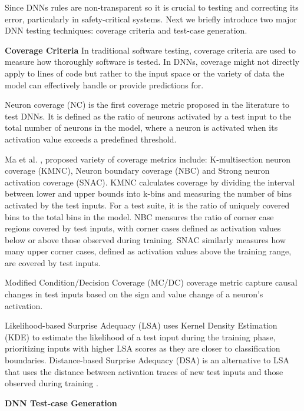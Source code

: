 \documentclass[10pt, conference, a4paper, final]{IEEEtran}
\begin{document}
Since DNNs rules are non-transparent \cite{deepxplore}  so it is crucial to testing and correcting its error, particularly in safety-critical systems. Next we briefly introduce two major DNN testing techniques: coverage criteria and test-case generation.

\smallskip\noindent%
\textbf{Coverage Criteria}
In traditional software testing, coverage criteria are used to measure how thoroughly software is tested. In DNNs, coverage might not directly apply to lines of code but rather to the input space or the variety of data the model can effectively handle or provide predictions for.

Neuron coverage (NC) \cite{deepxplore} is the first coverage metric proposed in the literature to test DNNs. It is defined as the ratio of neurons activated by a test input to the total number of neurons in the model, where a neuron is activated when its activation value exceeds a predefined threshold. 

Ma et al. \cite{deepguage}, proposed variety of coverage metrics include: K-multisection neuron coverage (KMNC), Neuron boundary coverage (NBC) and Strong neuron activation coverage (SNAC). KMNC calculates coverage by dividing the interval between lower and upper bounds into k-bins and measuring the number of bins activated by the test inputs. For a test suite, it is the ratio of uniquely covered bins to the total bins in the model. NBC measures the ratio of corner case regions covered by test inputs, with corner cases defined as activation values below or above those observed during training. SNAC similarly measures how many upper corner cases, defined as activation values above the training range, are covered by test inputs. 

Modified Condition/Decision Coverage (MC/DC) \cite{SunY} coverage metric  capture causal changes in test inputs based on the sign and value change of a neuron's activation. 

Likelihood-based Surprise Adequacy (LSA) uses Kernel Density Estimation (KDE) to estimate the likelihood of a test input during the training phase, prioritizing inputs with higher LSA scores as they are closer to classification boundaries. Distance-based Surprise Adequacy (DSA) is an alternative to LSA that uses the distance between activation traces of new test inputs and those observed during training \cite{KimJ}.

\smallskip\noindent%
\textbf{DNN Test-case Generation}
\end{document}
